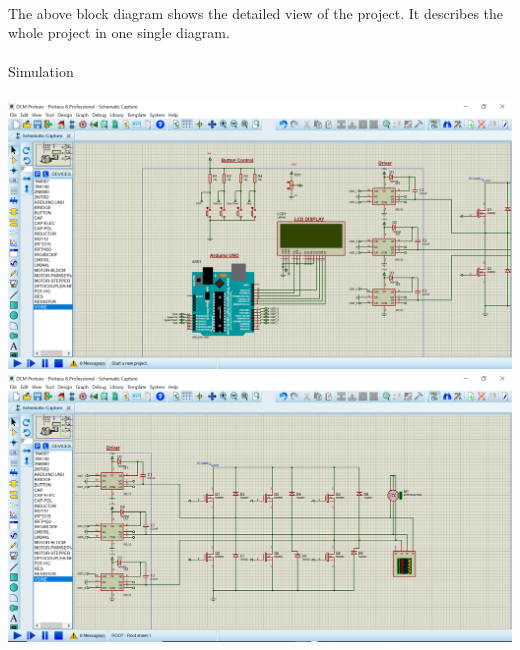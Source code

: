 \\
The above block diagram shows the detailed view of the project. It describes the whole project in one single diagram.
\\ \\
{\large Simulation}
\\ \\
{\includegraphics[height=0.3\textheight]{Figures/pro1.png}}
\\
{\includegraphics[height=0.3\textheight]{Figures/pro2.png}}
\\ \\






